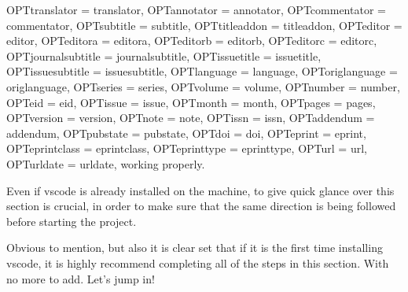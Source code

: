 {	OPTtranslator = {translator},
	OPTannotator = {annotator},
	OPTcommentator = {commentator},
	OPTsubtitle = {subtitle},
	OPTtitleaddon = {titleaddon},
	OPTeditor = {editor},
	OPTeditora = {editora},
	OPTeditorb = {editorb},
	OPTeditorc = {editorc},
	OPTjournalsubtitle = {journalsubtitle},
	OPTissuetitle = {issuetitle},
	OPTissuesubtitle = {issuesubtitle},
	OPTlanguage = {language},
	OPToriglanguage = {origlanguage},
	OPTseries = {series},
	OPTvolume = {volume},
	OPTnumber = {number},
	OPTeid = {eid},
	OPTissue = {issue},
	OPTmonth = {month},
	OPTpages = {pages},
	OPTversion = {version},
	OPTnote = {note},
	OPTissn = {issn},
	OPTaddendum = {addendum},
	OPTpubstate = {pubstate},
	OPTdoi = {doi},
	OPTeprint = {eprint},
	OPTeprintclass = {eprintclass},
	OPTeprinttype = {eprinttype},
	OPTurl = {url},
	OPTurldate = {urldate},
}
working properly.

Even if \ac{vscode} is already installed on the machine, to give quick glance over this section is crucial, in order to make sure that the same direction is being followed before starting the project. 

Obvious to mention, but also it is clear set that if it is the first time installing \ac{vscode}, it is highly recommend completing all of the steps in this section. With no more to add. Let’s jump in!

